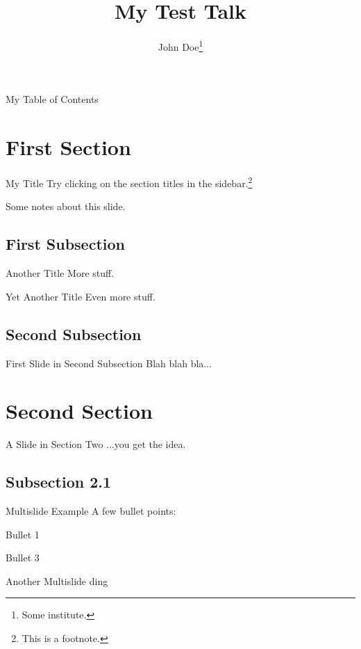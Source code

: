 \documentclass[12pt,screen]{talk}
\title{My Test Talk}
\author[John Doe]{John Doe\thanks{Some institute.}}
\begin{document}
\begin{slide}[plain]{}
  \maketitle
\end{slide}

\begin{slide}[outline]{My Table of Contents}
  \tableofcontents
\end{slide}

\section{First Section}

\begin{slide}{My Title}
  Try clicking on the section titles in the sidebar.\footnote{This is a
  footnote.}
\end{slide}
\begin{notes}
  Some notes about this slide.
\end{notes}

\subsection{First Subsection}
\begin{slide}{Another Title}
  More stuff.
\end{slide}
\begin{slide}{Yet Another Title}
  Even more stuff.
\end{slide}

\subsection{Second Subsection}
\begin{slide}{First Slide in Second Subsection}
  Blah blah bla...
\end{slide}

\section{Second Section}

\begin{slide}{A Slide in Section Two}
  ...you get the idea.
\end{slide}

\subsection{Subsection 2.1}
\begin{multislide}{3}{Multislide Example}
  A few bullet points:
  \begin{itemize}
  \item Bullet 1
  {\item Bullet 3}
  \end{itemize}
\end{multislide}

\begin{multislide}{2}{Another Multislide}
  ding 
\end{multislide}
\end{document}
